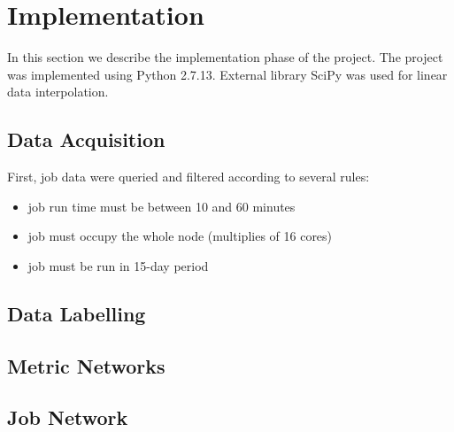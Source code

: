 \section{Implementation}
In this section we describe the implementation phase of the project. The project was implemented using Python 2.7.13. External library SciPy\cite{scipy} was used for linear data interpolation.

\label{sec:implementation}

\subsection{Data Acquisition}
\label{sec:data-filter}
First, job data were queried and filtered according to several rules:
\begin{itemize}
    \item job run time must be between 10 and 60 minutes
    \item job must occupy the whole node (multiplies of 16 cores)
    \item job must be run in 15-day period
\end{itemize}

\subsection{Data Labelling}

\subsection{Metric Networks}

\subsection{Job Network}

